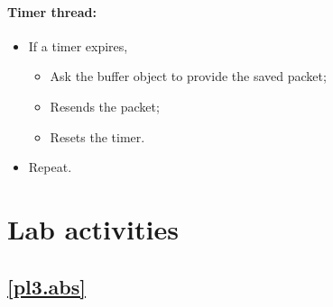 \documentclass[12pt]{book}
\begin{document}
\paragraph{Timer thread:}

\begin{itemize}
\item If a timer expires,
  \begin{itemize}
  \item Ask the buffer object to provide the saved packet;
  \item Resends the packet;
    \item Resets the timer.
  \end{itemize}
\item Repeat.
\end{itemize}

\section{Lab activities}\label{seqnr.se}

\subsection{\ref{pl3.abs}}
\end{document}
